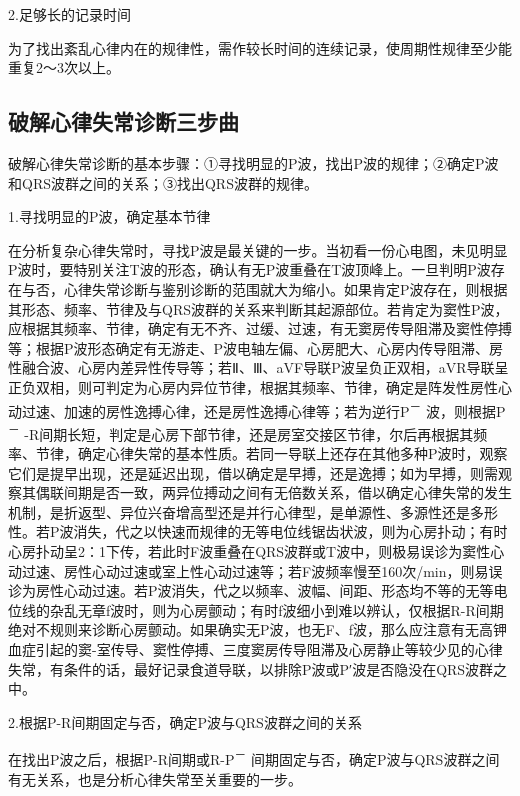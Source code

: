 2.足够长的记录时间

为了找出紊乱心律内在的规律性，需作较长时间的连续记录，使周期性规律至少能重复2～3次以上。

\protect\hypertarget{text00016.htmlux5cux23subid117}{}{}

\subsection{破解心律失常诊断三步曲}

破解心律失常诊断的基本步骤：①寻找明显的P波，找出P波的规律；②确定P波和QRS波群之间的关系；③找出QRS波群的规律。

1.寻找明显的P波，确定基本节律

在分析复杂心律失常时，寻找P波是最关键的一步。当初看一份心电图，未见明显P波时，要特别关注T波的形态，确认有无P波重叠在T波顶峰上。一旦判明P波存在与否，心律失常诊断与鉴别诊断的范围就大为缩小。如果肯定P波存在，则根据其形态、频率、节律及与QRS波群的关系来判断其起源部位。若肯定为窦性P波，应根据其频率、节律，确定有无不齐、过缓、过速，有无窦房传导阻滞及窦性停搏等；根据P波形态确定有无游走、P波电轴左偏、心房肥大、心房内传导阻滞、房性融合波、心房内差异性传导等；若Ⅱ、Ⅲ、aVF导联P波呈负正双相，aVR导联呈正负双相，则可判定为心房内异位节律，根据其频率、节律，确定是阵发性房性心动过速、加速的房性逸搏心律，还是房性逸搏心律等；若为逆行P\textsuperscript{－}
波，则根据P\textsuperscript{－}
-R间期长短，判定是心房下部节律，还是房室交接区节律，尔后再根据其频率、节律，确定心律失常的基本性质。若同一导联上还存在其他多种P波时，观察它们是提早出现，还是延迟出现，借以确定是早搏，还是逸搏；如为早搏，则需观察其偶联间期是否一致，两异位搏动之间有无倍数关系，借以确定心律失常的发生机制，是折返型、异位兴奋增高型还是并行心律型，是单源性、多源性还是多形性。若P波消失，代之以快速而规律的无等电位线锯齿状波，则为心房扑动；有时心房扑动呈2：1下传，若此时F波重叠在QRS波群或T波中，则极易误诊为窦性心动过速、房性心动过速或室上性心动过速等；若F波频率慢至160次/min，则易误诊为房性心动过速。若P波消失，代之以频率、波幅、间距、形态均不等的无等电位线的杂乱无章f波时，则为心房颤动；有时f波细小到难以辨认，仅根据R-R间期绝对不规则来诊断心房颤动。如果确实无P波，也无F、f波，那么应注意有无高钾血症引起的窦-室传导、窦性停搏、三度窦房传导阻滞及心房静止等较少见的心律失常，有条件的话，最好记录食道导联，以排除P波或P′波是否隐没在QRS波群之中。

2.根据P-R间期固定与否，确定P波与QRS波群之间的关系

在找出P波之后，根据P-R间期或R-P\textsuperscript{－}
间期固定与否，确定P波与QRS波群之间有无关系，也是分析心律失常至关重要的一步。


